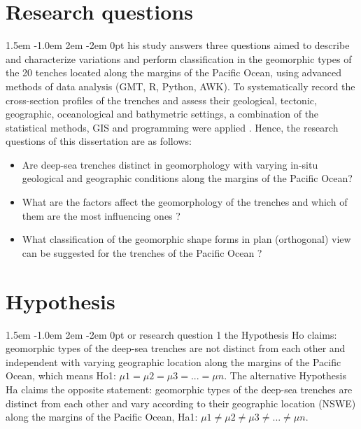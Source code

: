 \documentclass[11pt,a4paper]{report}
\def\pstart#1{\noindent\smash{\lower1.5ex\hbox{\llap{\Cal#1}}\hskip-.1ex}
  \parshape=3 1.5em \dimexpr\hsize-1.0em 2em \dimexpr\hsize-2em 0pt \hsize}
\begin{document}
\section{Research questions}
\pstart This study answers three questions aimed to describe and characterize variations and perform classification in the geomorphic types of the 20 tenches located along the margins of the Pacific Ocean, using advanced methods of data analysis (GMT, R, Python, AWK). To systematically record the cross-section profiles of the trenches and assess their geological, tectonic, geographic, oceanological and bathymetric settings, a combination of the statistical methods, \ac{GIS} and programming were applied \cite{Lemenkova201997}. Hence, the research questions of this dissertation are as follows: 

\begin{itemize}
	\item Are deep-sea trenches distinct in geomorphology with varying in-situ geological and geographic conditions along the margins of the Pacific Ocean? 
	\item What are the factors affect the geomorphology of the trenches and which of them are the most influencing ones ?
	\item What classification of the geomorphic shape forms in plan (orthogonal) view can be suggested for the trenches of the Pacific Ocean ?
\end{itemize}

\section{Hypothesis}
\pstart For research question 1 the Hypothesis Ho claims: geomorphic types of the deep-sea trenches are not distinct from each other and independent with varying geographic location along the margins of the Pacific Ocean, which means Ho1: $\mu1= \mu2 = \mu3 = ... = \mu n$.
The alternative Hypothesis Ha claims the opposite statement: geomorphic types of the deep-sea trenches are distinct from each other and vary according to their geographic location (NSWE) along the margins of the Pacific Ocean, Ha1: $\mu1\neq \mu2 \neq \mu3 \neq ... \neq \mu n$. 
\end{document}
